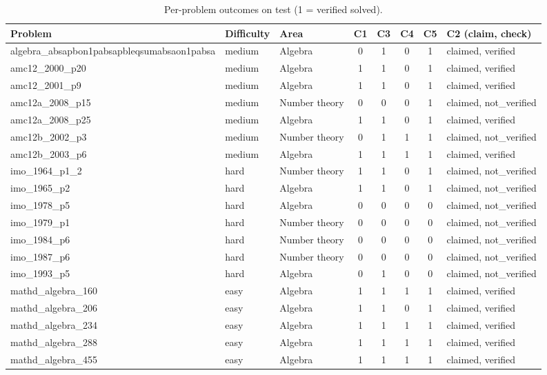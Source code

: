 \begin{table}[t]
\centering
\scriptsize
\setlength{\tabcolsep}{3pt}
\caption{Per-problem outcomes on test (1 = verified solved).}
\label{tab:per-problem}
\begin{tabular}{lllccccl}
\toprule
Problem & Difficulty & Area & C1 & C3 & C4 & C5 & C2 (claim, check) \\
\midrule
algebra\_absapbon1pabsapbleqsumabsaon1pabsa & medium & Algebra & 0 & 1 & 0 & 1 & claimed, verified \\
amc12\_2000\_p20 & medium & Algebra & 1 & 1 & 0 & 1 & claimed, verified \\
amc12\_2001\_p9 & medium & Algebra & 1 & 1 & 0 & 1 & claimed, verified \\
amc12a\_2008\_p15 & medium & Number theory & 0 & 0 & 0 & 1 & claimed, not\_verified \\
amc12a\_2008\_p25 & medium & Algebra & 1 & 1 & 0 & 1 & claimed, verified \\
amc12b\_2002\_p3 & medium & Number theory & 0 & 1 & 1 & 1 & claimed, not\_verified \\
amc12b\_2003\_p6 & medium & Algebra & 1 & 1 & 1 & 1 & claimed, verified \\
imo\_1964\_p1\_2 & hard & Number theory & 1 & 1 & 0 & 1 & claimed, not\_verified \\
imo\_1965\_p2 & hard & Algebra & 1 & 1 & 0 & 1 & claimed, not\_verified \\
imo\_1978\_p5 & hard & Algebra & 0 & 0 & 0 & 0 & claimed, not\_verified \\
imo\_1979\_p1 & hard & Number theory & 0 & 0 & 0 & 0 & claimed, not\_verified \\
imo\_1984\_p6 & hard & Number theory & 0 & 0 & 0 & 0 & claimed, not\_verified \\
imo\_1987\_p6 & hard & Number theory & 0 & 0 & 0 & 0 & claimed, not\_verified \\
imo\_1993\_p5 & hard & Algebra & 0 & 1 & 0 & 0 & claimed, not\_verified \\
mathd\_algebra\_160 & easy & Algebra & 1 & 1 & 1 & 1 & claimed, verified \\
mathd\_algebra\_206 & easy & Algebra & 1 & 1 & 0 & 1 & claimed, verified \\
mathd\_algebra\_234 & easy & Algebra & 1 & 1 & 1 & 1 & claimed, verified \\
mathd\_algebra\_288 & easy & Algebra & 1 & 1 & 1 & 1 & claimed, verified \\
mathd\_algebra\_455 & easy & Algebra & 1 & 1 & 1 & 1 & claimed, verified \\

\end{tabular}
\end{table}
